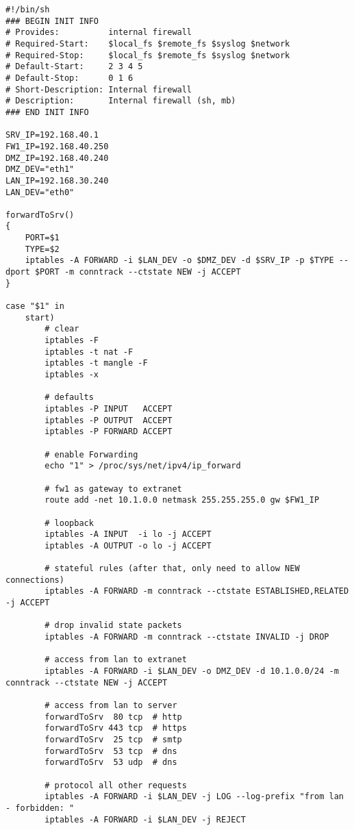 \begin{lstlisting}[label=lst:masq,caption={Basisskript interne Firewall.}]
#!/bin/sh
### BEGIN INIT INFO
# Provides:          internal firewall
# Required-Start:    $local_fs $remote_fs $syslog $network
# Required-Stop:     $local_fs $remote_fs $syslog $network
# Default-Start:     2 3 4 5
# Default-Stop:      0 1 6
# Short-Description: Internal firewall
# Description:       Internal firewall (sh, mb)
### END INIT INFO

SRV_IP=192.168.40.1
FW1_IP=192.168.40.250
DMZ_IP=192.168.40.240
DMZ_DEV="eth1"
LAN_IP=192.168.30.240
LAN_DEV="eth0"

forwardToSrv()
{
    PORT=$1
    TYPE=$2
    iptables -A FORWARD -i $LAN_DEV -o $DMZ_DEV -d $SRV_IP -p $TYPE --dport $PORT -m conntrack --ctstate NEW -j ACCEPT
}

case "$1" in
    start)
        # clear
        iptables -F
        iptables -t nat -F
        iptables -t mangle -F
        iptables -x

        # defaults
        iptables -P INPUT   ACCEPT
        iptables -P OUTPUT  ACCEPT
        iptables -P FORWARD ACCEPT

        # enable Forwarding
        echo "1" > /proc/sys/net/ipv4/ip_forward

        # fw1 as gateway to extranet
        route add -net 10.1.0.0 netmask 255.255.255.0 gw $FW1_IP

        # loopback
        iptables -A INPUT  -i lo -j ACCEPT
        iptables -A OUTPUT -o lo -j ACCEPT

        # stateful rules (after that, only need to allow NEW connections)
        iptables -A FORWARD -m conntrack --ctstate ESTABLISHED,RELATED -j ACCEPT

        # drop invalid state packets
        iptables -A FORWARD -m conntrack --ctstate INVALID -j DROP

        # access from lan to extranet
        iptables -A FORWARD -i $LAN_DEV -o DMZ_DEV -d 10.1.0.0/24 -m conntrack --ctstate NEW -j ACCEPT

        # access from lan to server
        forwardToSrv  80 tcp  # http
        forwardToSrv 443 tcp  # https
        forwardToSrv  25 tcp  # smtp
        forwardToSrv  53 tcp  # dns
        forwardToSrv  53 udp  # dns

        # protocol all other requests
        iptables -A FORWARD -i $LAN_DEV -j LOG --log-prefix "from lan - forbidden: "
        iptables -A FORWARD -i $LAN_DEV -j REJECT


\end{lstlisting}
